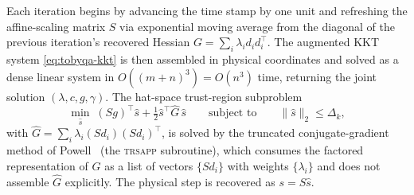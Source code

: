 \documentclass[11pt,a4paper]{article}
\begin{document}
Each iteration begins by advancing the time stamp by one unit and
refreshing the affine-scaling matrix $S$ via exponential moving
average from the diagonal of the previous iteration's recovered
Hessian $G = \sum_i \lambda_i d_i d_i^{\!\top}$. The augmented KKT
system \eqref{eq:tobyqa-kkt} is then assembled in physical coordinates
and solved as a dense linear system in $O((m+n)^3) = O(n^3)$ time,
returning the joint solution $(\lambda, c, g, \gamma)$. The
hat-space trust-region subproblem
\begin{equation}\label{eq:trsub-main}
  \min_{\hat s}\;
  (S g)^{\!\top}\hat s
  + \tfrac{1}{2}\hat s^{\!\top}\hat G\,\hat s
  \qquad\text{subject to}\qquad
  \|\hat s\|_2 \le \Delta_k,
\end{equation}
with $\hat G = \sum_i \lambda_i (S d_i)(S d_i)^{\!\top}$, is solved
by the truncated conjugate-gradient method of
Powell~\cite{Powell2006NEWUOA} (the \textsc{trsapp} subroutine),
which consumes the factored representation of $\hat G$ as a
list of vectors $\{S d_i\}$ with weights $\{\lambda_i\}$ and does
not assemble $\hat G$ explicitly. The physical step is recovered
as $s = S \hat s$.
\end{document}
